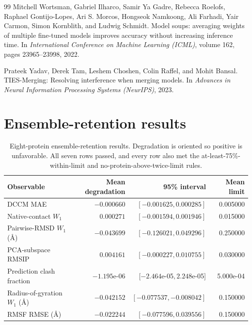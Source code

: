 \documentclass{article}
\begin{document}
\begin{thebibliography}{99}
Mitchell Wortsman, Gabriel Ilharco, Samir Ya Gadre, Rebecca Roelofs, Raphael Gontijo-Lopes, Ari S. Morcos, Hongseok Namkoong, Ali Farhadi, Yair Carmon, Simon Kornblith, and Ludwig Schmidt.
Model soups: averaging weights of multiple fine-tuned models improves accuracy without increasing inference time.
In \emph{International Conference on Machine Learning (ICML)}, volume 162, pages 23965--23998, 2022.

Prateek Yadav, Derek Tam, Leshem Choshen, Colin Raffel, and Mohit Bansal.
TIES-Merging: Resolving interference when merging models.
In \emph{Advances in Neural Information Processing Systems (NeurIPS)}, 2023.

\end{thebibliography}

\appendix

\section{Ensemble-retention results}
\label{app:retention}

\begin{table}[h]
\centering
\caption{Eight-protein ensemble-retention results. Degradation is oriented so positive is unfavorable. All seven rows passed, and every row also met the at-least-75\%-within-limit and no-protein-above-twice-limit rules.}
\label{tab:retention}
\small
\begin{tabular}{lrrr}
\toprule
Observable & Mean degradation & 95\% interval & Mean limit \\
\midrule
DCCM MAE                     & $-0.000660$   & $[-0.001625, 0.000285]$   & 0.005000 \\
Native-contact $W_1$         & $0.000271$    & $[-0.001594, 0.001946]$   & 0.015000 \\
Pairwise-RMSD $W_1$ (\AA)    & $-0.043699$   & $[-0.126021, 0.049296]$   & 0.250000 \\
PCA-subspace RMSIP           & $0.004161$    & $[-0.000227, 0.010755]$   & 0.030000 \\
Prediction clash fraction    & $-1.195$e-06  & $[-2.464$e-05$, 2.248$e-05$]$ & 5.000e-04 \\
Radius-of-gyration $W_1$ (\AA) & $-0.042152$ & $[-0.077537, -0.008042]$  & 0.150000 \\
RMSF RMSE (\AA)              & $-0.022244$   & $[-0.077596, 0.039556]$   & 0.150000 \\
\bottomrule
\end{tabular}
\end{table}
\end{document}
